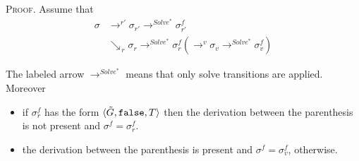 \documentclass[final]{acmtrans2e}
\newcommand{\la}{\langle}
\newcommand{\ra}{\rangle}
\newcommand{\rrarrow}{\longrightarrow}
\begin{document}
\textsc{Proof.}
Assume that
$$
\begin{array}{rl}
\sigma&\rrarrow^{r'}\sigma_{r'}\rrarrow^{Solve^{*}}
\sigma_{r'}^f\\
&\searrow_{\, r}
\sigma_r \rrarrow^{Solve^{*}}
\sigma_r^f (\rrarrow^v
\sigma_v\rrarrow^{Solve^{*}}
\sigma_v^f)
\end{array}
$$

The labeled arrow $\rrarrow^{Solve^{*}}$ means that only solve transitions are applied.
Moreover
\begin{itemize}
           \item if $\sigma_r^f$ has the form
$\la \tilde G, {\tt false}, T\ra$ then the derivation between the parenthesis is not present and $\sigma^f=\sigma_r^f$.
           \item the derivation between the parenthesis is present and $\sigma^f=\sigma_v^f$, otherwise.
         \end{itemize}
\end{document}

